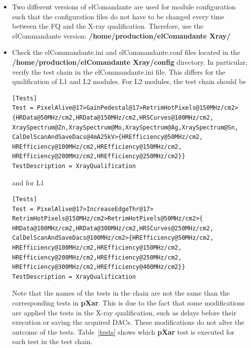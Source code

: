 \documentclass[a4paper,12pt,twoside]{article}
\begin{document}
\begin{itemize}
\item Two different versions of elComandante are used for module configuration such that the configuration files do not have to be changed every time between the FQ and the X-ray qualification. Therefore, use the elCommandante version:  \textbf{/home/production/elComandante{\color{Red} Xray}/}
\item Check the elCommandante.ini and elCommandante.conf files located in the \textbf{/home/production/elComandante{\color{Red} Xray}/config} directory. In particular, verify the test chain in the elCommandante.ini file. This differs for the qualification of L1 and L2 modules. For L2 modules, the test chain should be

\begin{Verbatim}[frame=single]
[Tests]
Test = PixelAlive@17>GainPedestal@17>RetrimHotPixels@150MHz/cm2>
{HRData@50MHz/cm2,HRData@150MHz/cm2,HRSCurves@100MHz/cm2,
XraySpectrum@Zn,XraySpectrum@Mo,XraySpectrum@Ag,XraySpectrum@Sn,
CalDelScanAndSaveDacs@4mA25kV>{HREfficiency@50MHz/cm2,
HREfficiency@100MHz/cm2,HREfficiency@150MHz/cm2,
HREfficiency@200MHz/cm2,HREfficiency@250MHz/cm2}}
TestDescription = XrayQualification
\end{Verbatim}

and for L1

\begin{Verbatim}[frame=single]
[Tests]
Test = PixelAlive@17>IncreaseEdgeThr@17>
RetrimHotPixels@150MHz/cm2>RetrimHotPixels@50MHz/cm2>{
HRData@100MHz/cm2,HRData@300MHz/cm2,HRSCurves@250MHz/cm2,
CalDelScanAndSaveDacs@100MHz/cm2>{HREfficiency@50MHz/cm2,
HREfficiency@100MHz/cm2,HREfficiency@150MHz/cm2,
HREfficiency@200MHz/cm2,HREfficiency@250MHz/cm2,
HREfficiency@300MHz/cm2,HREfficiency@400MHz/cm2}}
TestDescription = XrayQualification
\end{Verbatim}



Note that the names of the tests in the chain are not the same than the corresponding tests in \textbf{pXar}. This is due to the fact that some modifications are applied the tests in the X-ray qualification, such as delays before their execution or saving the acquired DACs. These modifications do not alter the outcome of the tests. 
Table~\ref{tests} shows which \textbf{pXar} test is executed for each test in the test chain.



\end{itemize}
\end{document}
